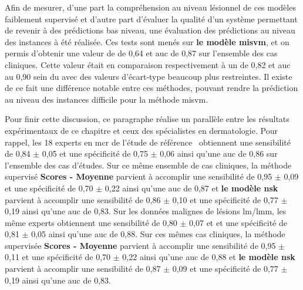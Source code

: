 Afin de mesurer, d'une part la compréhension au niveau lésionnel de ces modèles faiblement supervisé et d'autre part d'évaluer la qualité d'un système permettant de revenir à des prédictions bas niveau, une évaluation des prédictions au niveau des instances à été réalisée. Ces tests sont menés sur \textbf{le modèle \gls{misvm}}, et on permis d'obtenir une valeur de \fscore{} de 0,64 et \gls{auc} de 0,87 sur l'ensemble des cas cliniques. Cette valeur était en comparaison respectivement à un \fscore{} de 0,82 et \gls{auc} au 0,90 sein du  avec des valeurs d'écart-type beaucoup plus restreintes. Il existe de ce fait une différence notable entre ces méthodes, pouvant rendre la prédiction au niveau des instances difficile pour la méthode \gls{misvm}.\par

Pour finir cette discussion, ce paragraphe réalise un parallèle entre les résultats expérimentaux de ce chapitre et ceux des spécialistes en dermatologie. Pour rappel, les 18 experts en \gls{mcr} de l’étude de référence~\cite{Cinotti2016} obtiennent une sensibilité de 0,84 $\pm$ 0,05 et une spécificité de 0,75 $\pm$ 0,06 ainsi qu'une \gls{auc} de 0,86 sur l'ensemble des cas d'études. Sur ce même ensemble de cas cliniques, la méthode supervisé \textbf{Scores - Moyenne} parvient à accomplir une sensibilité de 0,95 $\pm$ 0,09 et une spécificité de 0,70 $\pm$ 0,22 ainsi qu'une \gls{auc} de 0,87 et \textbf{le modèle \gls{nsk}} parvient à accomplir une sensibilité de 0,86 $\pm$ 0,10 et une spécificité de 0,77 $\pm$ 0,19 ainsi qu'une \gls{auc} de 0,83. Sur les données malignes de lésions \gls{lm}/\gls{lmm}, les même experts obtiennent une sensibilité de 0,80 $\pm$ 0,07 et et une spécificité de 0,81 $\pm$ 0,05 ainsi qu'une \gls{auc} de 0,88. Sur ces mêmes cas cliniques, la méthode supervisée \textbf{Scores - Moyenne} parvient à accomplir une sensibilité de 0,95 $\pm$ 0,11 et une spécificité de 0,70 $\pm$ 0,22 ainsi qu'une \gls{auc} de 0,88 et \textbf{le modèle \gls{nsk}} parvient à accomplir une sensibilité de 0,87 $\pm$ 0,09 et une spécificité de 0,77 $\pm$ 0,19 ainsi qu'une \gls{auc} de 0,83.\par